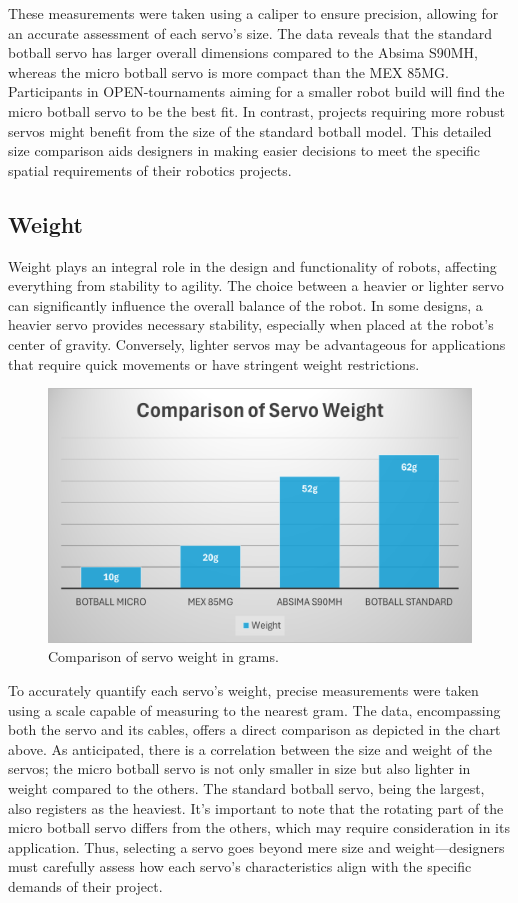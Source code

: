 \documentclass[conference]{IEEEtran}
\begin{document}
These measurements were taken using a caliper to ensure precision, allowing for an accurate assessment of each servo's size. The data reveals that the standard botball servo has larger overall dimensions compared to the Absima S90MH, whereas the micro botball servo is more compact than the MEX 85MG. Participants in OPEN-tournaments aiming for a smaller robot build will find the micro botball servo to be the best fit. In contrast, projects requiring more robust servos might benefit from the size of the standard botball model. This detailed size comparison aids designers in making easier decisions to meet the specific spatial requirements of their robotics projects.

\subsection{Weight}
Weight plays an integral role in the design and functionality of robots, affecting everything from stability to agility. The choice between a heavier or lighter servo can significantly influence the overall balance of the robot. In some designs, a heavier servo provides necessary stability, especially when placed at the robot's center of gravity. Conversely, lighter servos may be advantageous for applications that require quick movements or have stringent weight restrictions.

\begin{figure}[hbpt]
\centering
\includegraphics[width=\linewidth]{weight_comparison_chart.png}
\caption{Comparison of servo weight in grams.}
\label{fig:weight_comparison}
\end{figure}

To accurately quantify each servo's weight, precise measurements were taken using a scale capable of measuring to the nearest gram. The data, encompassing both the servo and its cables, offers a direct comparison as depicted in the chart above. As anticipated, there is a correlation between the size and weight of the servos; the micro botball servo is not only smaller in size but also lighter in weight compared to the others. The standard botball servo, being the largest, also registers as the heaviest. It's important to note that the rotating part of the micro botball servo differs from the others, which may require consideration in its application. Thus, selecting a servo goes beyond mere size and weight—designers must carefully assess how each servo's characteristics align with the specific demands of their project.
\end{document}
